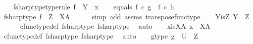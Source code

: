 \begin{isabellebody}
\ \ \isamarkupfalse%
\ f{\isacharunderscore}{\kern0pt}sharp{\isacharunderscore}{\kern0pt}type{\isacharbrackleft}{\kern0pt}type{\isacharunderscore}{\kern0pt}rule{\isacharbrackright}{\kern0pt}{\isacharcolon}{\kern0pt}\ {\isachardoublequoteopen}f\isactrlsup {\isasymsharp}\ {\isacharcolon}{\kern0pt}\ Y\ {\isasymrightarrow}\ x{\isachardoublequoteclose}\isanewline
\ \ \isamarkupfalse%
\ equals{\isacharcolon}{\kern0pt}\ {\isachardoublequoteopen}f\isactrlsup {\isasymsharp}\ {\isasymcirc}\isactrlsub c\ g\ {\isacharequal}{\kern0pt}\ f\isactrlsup {\isasymsharp}\ {\isasymcirc}\isactrlsub c\ h{\isachardoublequoteclose}\isanewline
\isanewline
\ \ \isamarkupfalse%
\ f{\isacharunderscore}{\kern0pt}sharp{\isacharunderscore}{\kern0pt}type{}{\isacharcolon}{\kern0pt}\ {\isachardoublequoteopen}f\isactrlsup {\isasymsharp}\ {\isacharcolon}{\kern0pt}\ Z\ {\isasymrightarrow}\ X\isactrlbsup A\isactrlesup {\isachardoublequoteclose}\isanewline
\ \ \ \ \isamarkupfalse%
\ {\isacharparenleft}{\kern0pt}simp\ add{\isacharcolon}{\kern0pt}\ assms{\isacharparenleft}{\kern0pt}{}{\isacharparenright}{\kern0pt}\ transpose{\isacharunderscore}{\kern0pt}func{\isacharunderscore}{\kern0pt}type{\isacharparenright}{\kern0pt}\isanewline
\ \ \isamarkupfalse%
\ Y{\isacharunderscore}{\kern0pt}is{\isacharunderscore}{\kern0pt}Z{\isacharcolon}{\kern0pt}\ {\isachardoublequoteopen}Y\ {\isacharequal}{\kern0pt}\ Z{\isachardoublequoteclose}\isanewline
\ \ \ \ \isamarkupfalse%
\ cfunc{\isacharunderscore}{\kern0pt}type{\isacharunderscore}{\kern0pt}def\ f{\isacharunderscore}{\kern0pt}sharp{\isacharunderscore}{\kern0pt}type\ f{\isacharunderscore}{\kern0pt}sharp{\isacharunderscore}{\kern0pt}type{}\ \isamarkupfalse%
\ auto\isanewline
\ \ \isamarkupfalse%
\ x{\isacharunderscore}{\kern0pt}is{\isacharunderscore}{\kern0pt}XA{\isacharcolon}{\kern0pt}\ {\isachardoublequoteopen}x\ {\isacharequal}{\kern0pt}\ X\isactrlbsup A\isactrlesup {\isachardoublequoteclose}\isanewline
\ \ \ \ \isamarkupfalse%
\ cfunc{\isacharunderscore}{\kern0pt}type{\isacharunderscore}{\kern0pt}def\ f{\isacharunderscore}{\kern0pt}sharp{\isacharunderscore}{\kern0pt}type\ f{\isacharunderscore}{\kern0pt}sharp{\isacharunderscore}{\kern0pt}type{}\ \isamarkupfalse%
\ auto\isanewline
\ \ \isamarkupfalse%
\ g{\isacharunderscore}{\kern0pt}type{}{\isacharcolon}{\kern0pt}\ {\isachardoublequoteopen}g\ {\isacharcolon}{\kern0pt}\ U\ {\isasymrightarrow}\ Z{\isachardoublequoteclose}\isanewline

\end{isabellebody}
